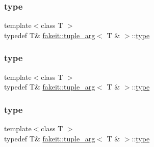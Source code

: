 \subsubsection{\texorpdfstring{type}{type}\hspace{0.1cm}{\footnotesize\ttfamily [1/9]}}
{\footnotesize\ttfamily template$<$class T $>$ \\
typedef T\& \mbox{\hyperlink{structfakeit_1_1tuple__arg}{fakeit\+::tuple\+\_\+arg}}$<$ T \& $>$\+::\mbox{\hyperlink{structfakeit_1_1tuple__arg_3_01T_01_6_01_4_aeee261e6ee2cf07e3bc1fd7783d41a67}{type}}}

\mbox{\label{structfakeit_1_1tuple__arg_3_01T_01_6_01_4_aeee261e6ee2cf07e3bc1fd7783d41a67}} 
\subsubsection{\texorpdfstring{type}{type}\hspace{0.1cm}{\footnotesize\ttfamily [2/9]}}
{\footnotesize\ttfamily template$<$class T $>$ \\
typedef T\& \mbox{\hyperlink{structfakeit_1_1tuple__arg}{fakeit\+::tuple\+\_\+arg}}$<$ T \& $>$\+::\mbox{\hyperlink{structfakeit_1_1tuple__arg_3_01T_01_6_01_4_aeee261e6ee2cf07e3bc1fd7783d41a67}{type}}}

\mbox{\label{structfakeit_1_1tuple__arg_3_01T_01_6_01_4_aeee261e6ee2cf07e3bc1fd7783d41a67}} 
\subsubsection{\texorpdfstring{type}{type}\hspace{0.1cm}{\footnotesize\ttfamily [3/9]}}
{\footnotesize\ttfamily template$<$class T $>$ \\
typedef T\& \mbox{\hyperlink{structfakeit_1_1tuple__arg}{fakeit\+::tuple\+\_\+arg}}$<$ T \& $>$\+::\mbox{\hyperlink{structfakeit_1_1tuple__arg_3_01T_01_6_01_4_aeee261e6ee2cf07e3bc1fd7783d41a67}{type}}}

\mbox{\label{structfakeit_1_1tuple__arg_3_01T_01_6_01_4_aeee261e6ee2cf07e3bc1fd7783d41a67}} 
